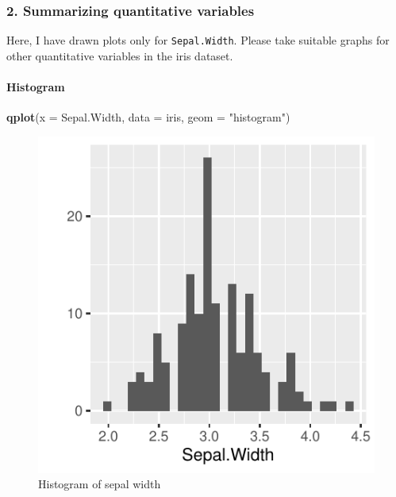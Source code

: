 \documentclass[]{article}
\newenvironment{Shaded}{\begin{snugshade}}{\end{snugshade}}
\newcommand{\DataTypeTok}[1]{\textcolor[rgb]{0.13,0.29,0.53}{#1}}
\newcommand{\KeywordTok}[1]{\textcolor[rgb]{0.13,0.29,0.53}{\textbf{#1}}}
\newcommand{\NormalTok}[1]{#1}
\newcommand{\StringTok}[1]{\textcolor[rgb]{0.31,0.60,0.02}{#1}}
\let\oldparagraph\paragraph
\renewcommand{\paragraph}[1]{\oldparagraph{#1}\mbox{}}
\begin{document}
\newpage

\hypertarget{summarizing-quantitative-variables}{%
\subsubsection{2. Summarizing quantitative
variables}\label{summarizing-quantitative-variables}}

Here, I have drawn plots only for \texttt{Sepal.Width}. Please take
suitable graphs for other quantitative variables in the iris dataset.

\hypertarget{histogram}{%
\paragraph{Histogram}\label{histogram}}

\begin{Shaded}
\begin{Highlighting}[]
\KeywordTok{qplot}\NormalTok{(}\DataTypeTok{x =}\NormalTok{ Sepal.Width, }\DataTypeTok{data =}\NormalTok{ iris, }\DataTypeTok{geom =} \StringTok{"histogram"}\NormalTok{)}
\end{Highlighting}
\end{Shaded}

\begin{figure}
\centering
\includegraphics{Week3Answers_files/figure-latex/unnamed-chunk-5-1.pdf}
\caption{Histogram of sepal width}
\end{figure}
\end{document}
